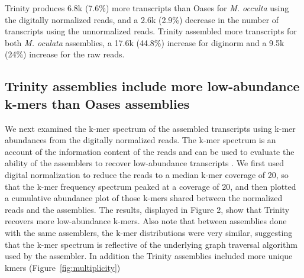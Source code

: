 \documentclass[fleqn,10pt]{wlpeerj}
\begin{document}
Trinity produces 6.8k (7.6\%) more transcripts than Oases for \textit{M. occulta} using the digitally normalized reads, and a 2.6k (2.9\%) decrease in the number of transcripts using the unnormalized reads. Trinity assembled more transcripts for both \textit{M. oculata} assemblies, a 17.6k (44.8\%) increase for diginorm and a 9.5k (24\%) increase for the raw reads. 

\subsection{Trinity assemblies include more low-abundance k-mers than Oases assemblies}
We next examined the k-mer spectrum of the assembled transcripts using k-mer abundances from the digitally normalized reads. The k-mer spectrum is an account of the information content of the reads and can be used to evaluate the ability of the assemblers to recover low-abundance transcripts \citep{pop_genome_2009}.  We first used digital normalization to reduce the reads to a median k-mer coverage of 20, so that the k-mer frequency spectrum peaked at a coverage of 20, and then plotted a cumulative abundance plot of those k-mers shared between the normalized reads and the assemblies. The results, displayed in Figure 2, show that Trinity recovers more low-abundance k-mers.  Also note that between assemblies done with the same assemblers, the k-mer distributions were very similar, suggesting that the k-mer spectrum is reflective of the underlying graph traversal algorithm used by the assembler. In addition the Trinity assemblies included more unique kmers (Figure~\ref{fig:multiplicity})
\end{document}
